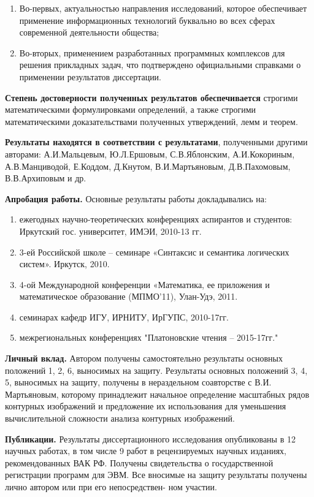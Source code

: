 \begin{enumerate}
\item Во-первых, актуальностью направления исследований, которое обеспечивает применение информационных технологий буквально во всех сферах современной деятельности общества;

\item Во-вторых, применением разработанных программных комплексов для решения прикладных задач, что подтверждено официальными справками о применении результатов диссертации.
\end{enumerate}

\textbf{Степень достоверности полученных результатов обеспечивается} строгими математическими формулировками определений, а также строгими математическими доказательствами полученных утверждений, лемм и теорем.

\textbf{Результаты находятся в соответствии с результатами}, полученными другими авторами: А.И.Мальцевым,  Ю.Л.Ершовым, С.В.Яблонским,  А.И.Кокориным, А.В.Манциводой,  Е.Коддом, Д.Кнутом, В.И.Мартьяновым, Д.В.Пахомовым, В.В.Архиповым и др.

\pagebreak
\textbf{Апробация работы.} Основные результаты работы докладывались на: 

\begin{enumerate}
\item ежегодных научно-теоретических конференциях аспирантов и студентов:  Иркутский  гос. университет, ИМЭИ, 2010-13 гг.
\item 3-ей Российской школе – семинаре «Синтаксис и семантика логических систем». Иркутск, 2010.
\item 4-ой Международной конференции «Математика, ее приложения и математическое образование (МПМО’11),  Улан-Удэ, 2011.
\item семинарах кафедр ИГУ, ИРНИТУ, ИрГУПС, 2010-17гг.
\item межрегиональных конференциях "Платоновские чтения – 2015-17гг."
\end{enumerate}


\textbf{Личный вклад.} Автором получены самостоятельно результаты основных положений 1, 2, 6,  выносимых  на защиту.  Результаты основных положений 3, 4, 5,  выносимых  на защиту, получены в нераздельном соавторстве с В.И. Мартьяновым, которому принадлежит начальное определение масштабных рядов контурных изображений и предложение их использования для уменьшения вычислительной сложности анализа контурных изображений.

\textbf{Публикации.} Результаты диссертационного исследования
опубликованы в 12 научных работах, в том числе 9 работ в рецензируемых научных изданиях, рекомендованных ВАК РФ. Получены свидетельства о государственной регистрации программ для ЭВМ.
Все вносимые на защиту результаты получены лично автором или при его непосредствен-
ном участии.

